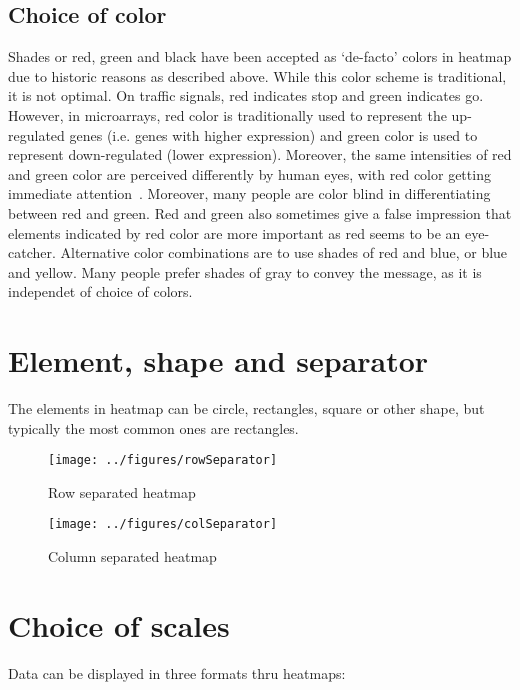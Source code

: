 \documentclass[12pt, oneside, letterpaper]{article}
\begin{document}
\subsection*{Choice of color}
	Shades or red, green and black have been accepted as
	`de-facto' colors in heatmap due to historic reasons as
	described above. While this color scheme is traditional, it
	is not optimal. On traffic signals, red indicates stop and
	green indicates go. However, in microarrays, red color is
	traditionally used to represent the up-regulated genes
	(i.e. genes with higher expression) and green color is used
	to represent down-regulated (lower expression). Moreover,
	the same intensities of red and green color are perceived
	differently by human eyes, with red color getting immediate
	attention~\cite{NaturePaper}.  Moreover, many people are color
	blind in differentiating between red and green. Red and
	green also sometimes give a false impression that elements
	indicated by red color are more important as red seems to be
	an eye-catcher. Alternative color combinations are to use
	shades of red and blue, or blue and yellow. Many people
	prefer shades of gray to convey the message, as it is
	independet of choice of colors.



\section*{Element, shape and separator}
	The elements in heatmap can be circle, rectangles, square or
	other shape, but typically the most common ones are
	rectangles.

\begin{figure*}[p]
\begin{minipage}[t]{2.5in}
\centering
\texttt{[image: ../figures/rowSeparator]}
\caption{Row separated heatmap}
\label{Row separated heatmap}
\end{minipage}
\hfill
\begin{minipage}[t]{2.5in}
\centering
\texttt{[image: ../figures/colSeparator]}
\caption{Column separated heatmap}
\label{Column separated heatmap}
\end{minipage}
\end{figure*}


\section*{Choice of scales}
Data can be displayed in three formats thru heatmaps:
\end{document}
